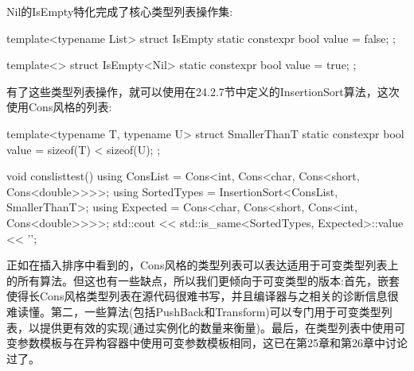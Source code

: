 Nil的IsEmpty特化完成了核心类型列表操作集:

\begin{cpp}
template<typename List>
struct IsEmpty {
	static constexpr bool value = false;
};

template<>
struct IsEmpty<Nil> {
	static constexpr bool value = true;
};
\end{cpp}

有了这些类型列表操作，就可以使用在24.2.7节中定义的InsertionSort算法，这次使用Cons风格的列表:

\begin{cpp}
template<typename T, typename U>
struct SmallerThanT {
	static constexpr bool value = sizeof(T) < sizeof(U);
};

void conslisttest()
{
	using ConsList = Cons<int, Cons<char, Cons<short, Cons<double>>>>;
	using SortedTypes = InsertionSort<ConsList, SmallerThanT>;
	using Expected = Cons<char, Cons<short, Cons<int, Cons<double>>>>;
	std::cout << std::is_same<SortedTypes, Expected>::value << '\n';
}
\end{cpp}

正如在插入排序中看到的，Cons风格的类型列表可以表达适用于可变类型列表上的所有算法。但这也有一些缺点，所以我们更倾向于可变类型的版本:首先，嵌套使得长Cons风格类型列表在源代码很难书写，并且编译器与之相关的诊断信息很难读懂。第二，一些算法(包括PushBack和Transform)可以专门用于可变类型列表，以提供更有效的实现(通过实例化的数量来衡量)。最后，在类型列表中使用可变参数模板与在异构容器中使用可变参数模板相同，这已在第25章和第26章中讨论过了。





















